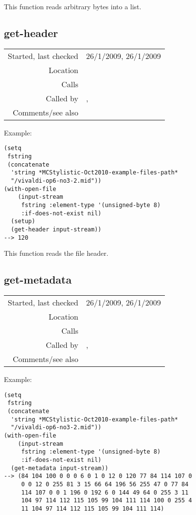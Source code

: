 \noindent This function reads arbitrary bytes into a
list.


\subsection*{get-header}\label{fun:get-header}

\vspace{0.3cm}
\begin{tabular}{r|p{8cm}}
Started, last checked & 26/1/2009, 26/1/2009 \\
Location & \nameref{sec:MIDI-import} \\
Calls & \\
Called by & \nameref{fun:get-metadata}, \nameref{fun:read-track} \\
Comments/see also &
\end{tabular}

\vspace{0.5cm}
\noindent Example:
\begin{verbatim}
(setq
 fstring
 (concatenate
  'string *MCStylistic-Oct2010-example-files-path*
  "/vivaldi-op6-no3-2.mid"))
(with-open-file
    (input-stream
     fstring :element-type '(unsigned-byte 8)
     :if-does-not-exist nil)
  (setup)
  (get-header input-stream))
--> 120
\end{verbatim}

\noindent This function reads the file header.


\subsection*{get-metadata}\label{fun:get-metadata}

\vspace{0.3cm}
\begin{tabular}{r|p{8cm}}
Started, last checked & 26/1/2009, 26/1/2009 \\
Location & \nameref{sec:MIDI-import} \\
Calls & \nameref{fun:gather-bytes} \\
Called by & \nameref{fun:parse-events}, \nameref{fun:read-track} \\
Comments/see also &
\end{tabular}

\vspace{0.5cm}
\noindent Example:
\begin{verbatim}
(setq
 fstring
 (concatenate
  'string *MCStylistic-Oct2010-example-files-path*
  "/vivaldi-op6-no3-2.mid"))
(with-open-file
    (input-stream
     fstring :element-type '(unsigned-byte 8)
     :if-does-not-exist nil)
  (get-metadata input-stream))
--> (84 104 100 0 0 0 6 0 1 0 12 0 120 77 84 114 107 0
     0 0 12 0 255 81 3 15 66 64 196 56 255 47 0 77 84
     114 107 0 0 1 196 0 192 6 0 144 49 64 0 255 3 11
     104 97 114 112 115 105 99 104 111 114 100 0 255 4
     11 104 97 114 112 115 105 99 104 111 114)
\end{verbatim}

